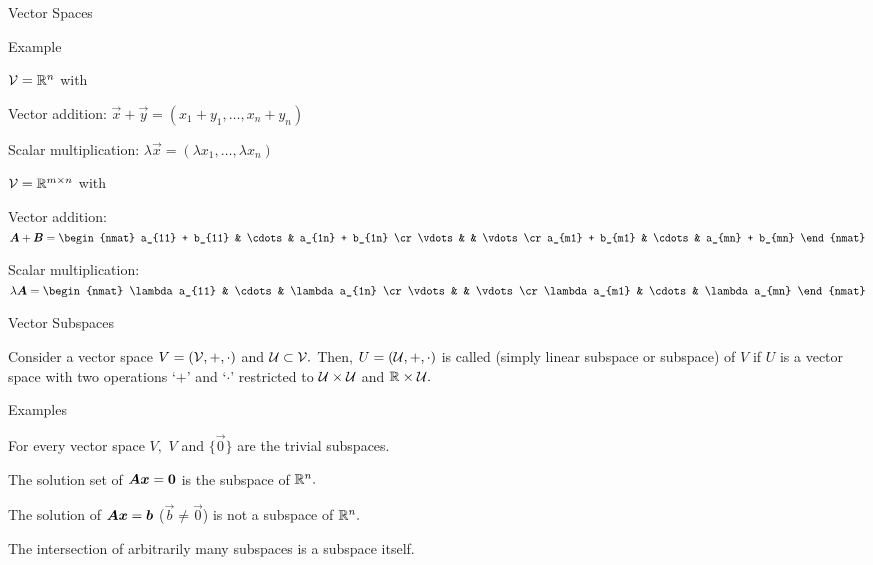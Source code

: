 \documentclass[fleqn,aspectratio=169]{beamer}
\begin{document}
\begin{frame}{Vector Spaces}
\end{frame}

\begin{frame}{Example} 

\plitemsep 0.1in

\bci
\item  $\mathcal V = {\mathbb R}^n$ with 
\bci
\item Vector addition: $\vec{x} + \vec{y} = (x_1 + y_1, \ldots, x_n + y_n)$ 
\item Scalar multiplication: $\lambda \vec{x} = (\lambda x_1, \ldots, \lambda x_n)$
\eci

\bigskip
\item $\mathcal V = {\mathbb R}^{m \times n}$ with 
\bci
\item Vector addition: $\mat{A} + \vec{B} 
= 
\begin{nmat}
a_{11} + b_{11} & \cdots & a_{1n} + b_{1n} \cr
\vdots & & \vdots \cr
a_{m1} + b_{m1} & \cdots & a_{mn} + b_{mn}
\end{nmat}
$ 
\item Scalar multiplication: $\lambda\mat{A}
= 
\begin{nmat}
\lambda a_{11}  & \cdots & \lambda a_{1n} \cr
\vdots & & \vdots \cr
\lambda a_{m1}  & \cdots & \lambda a_{mn} 
\end{nmat}
$ 
\eci
\eci
\end{frame}

\begin{frame}{Vector Subspaces} 

 Consider a vector space $V=(\mathcal V,+,\cdot)$ and $\mathcal U \subset \mathcal V.$
Then, $U=(\mathcal U,+,\cdot)$ is called  (simply linear subspace or subspace) of $V$ if $U$ is a vector space with two operations `$+$' and `$\cdot$' restricted to $\mathcal U \times \mathcal U$ and ${\mathbb R} \times \mathcal U.$

\bigskip



\plitemsep 0.1in

Examples

\bci

\item For every vector space $V,$ $V$ and $\{\vec{0} \}$ are the trivial subspaces. 

\item The solution set of $\bm{A} \bm{x} = \bm{0}$ is the subspace of ${\mathbb R}^n.$

\item The solution of $\bm{A} \bm{x} = \bm{b}$ ($\vec{b} \neq \vec{0}$) is not a subspace of ${\mathbb R}^n.$

\item The intersection of arbitrarily many subspaces is a subspace itself. 
\eci
\end{frame}
\end{document}
